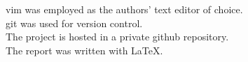 vim was employed as the authors' text editor of choice.
\\
git was used for version control.
\\
The project is hosted in a private github repository.
\\
The report was written with \LaTeX.
